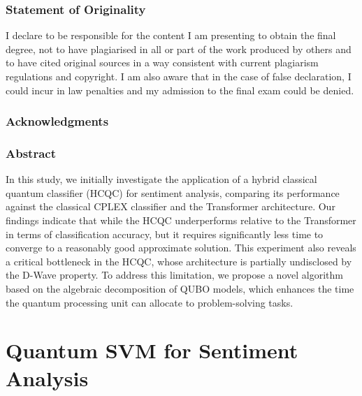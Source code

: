 \documentclass[11pt, oneside]{book}
\begin{document}

\newpage

\vfill
\section*{Statement of Originality}
I declare to be responsible for the content I am presenting to obtain the final degree, not to have plagiarised in all or part of the work produced by others and to have cited original sources in a way consistent with current plagiarism regulations and copyright. I am also aware that in the case of false declaration, I could incur in law penalties and my admission to the final exam could be denied.
\newpage

\section*{Acknowledgments}

\newpage

\section*{Abstract}
In this study, we initially investigate the application of a hybrid classical quantum classifier (HCQC) for sentiment analysis, comparing its performance against the classical CPLEX classifier and the Transformer architecture. 
Our findings indicate that while the HCQC underperforms relative to the Transformer in terms of classification accuracy, but it requires significantly less time to converge to a reasonably good approximate solution. 
This experiment also reveals a critical bottleneck in the HCQC, whose architecture is partially undisclosed by the D-Wave property. 
To address this limitation, we propose a novel algorithm based on the algebraic decomposition of QUBO models, which enhances the time the quantum processing unit can allocate to problem-solving tasks.

\newpage

\tableofcontents
\newpage





\part{Quantum SVM for Sentiment Analysis}


\end{document}
